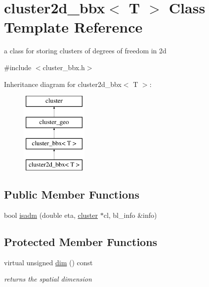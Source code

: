 \hypertarget{classcluster2d__bbx}{
\section{cluster2d\-\_\-bbx$<$ \-T $>$ \-Class \-Template \-Reference}
\label{classcluster2d__bbx}
}


a class for storing clusters of degrees of freedom in 2d  




{\ttfamily \#include $<$cluster\-\_\-bbx.\-h$>$}

\-Inheritance diagram for cluster2d\-\_\-bbx$<$ \-T $>$\-:\begin{figure}[H]
\begin{center}
\leavevmode
\includegraphics[height=4.000000cm]{classcluster2d__bbx}
\end{center}
\end{figure}
\subsection*{\-Public \-Member \-Functions}
\begin{DoxyCompactItemize}
\item 
bool \hyperlink{classcluster2d__bbx_a0c0e1d9841ed93b2a59b241fc68135e6}{isadm} (double eta, \hyperlink{classcluster}{cluster} $\ast$cl, bl\-\_\-info \&info)
\end{DoxyCompactItemize}
\subsection*{\-Protected \-Member \-Functions}
\begin{DoxyCompactItemize}
\item 
\hypertarget{classcluster2d__bbx_a1f4b5d08dcf3517cdb6e4c4f356a9495}{
virtual unsigned \hyperlink{classcluster2d__bbx_a1f4b5d08dcf3517cdb6e4c4f356a9495}{dim} () const }
\label{classcluster2d__bbx_a1f4b5d08dcf3517cdb6e4c4f356a9495}

\begin{DoxyCompactList}\small\item\em returns the spatial dimension \end{DoxyCompactList}\end{DoxyCompactItemize}


